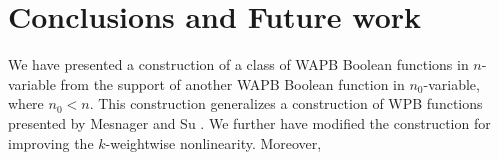 \documentclass{article}[12pt]
\begin{document}
\section{Conclusions and Future work}
We have presented a construction of a class of WAPB Boolean functions in $n$-variable from the support of another WAPB Boolean function in $n_0$-variable, where $n_0 < n$. This construction generalizes a construction of WPB functions presented by Mesnager and Su \cite{MS21}. We further have modified the construction for improving the $k$-weightwise nonlinearity. Moreover, 
\medskip


\end{document}
